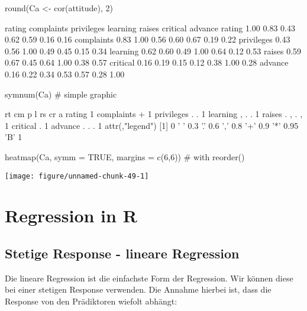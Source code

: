 \documentclass[a4paper,twoside]{tufte-book}\usepackage[]{graphicx}\usepackage[]{color}
\makeatletter
\def\maxwidth{ %
	\ifdim\Gin@nat@width>\linewidth
	\linewidth
	\else
	\Gin@nat@width
	\fi
}
\makeatother
\begin{document}
\begin{appendices}
\begin{Schunk}
\begin{Sinput}
round(Ca <- cor(attitude), 2)
\end{Sinput}
\begin{Soutput}
           rating complaints privileges learning raises critical advance
rating       1.00       0.83       0.43     0.62   0.59     0.16    0.16
complaints   0.83       1.00       0.56     0.60   0.67     0.19    0.22
privileges   0.43       0.56       1.00     0.49   0.45     0.15    0.34
learning     0.62       0.60       0.49     1.00   0.64     0.12    0.53
raises       0.59       0.67       0.45     0.64   1.00     0.38    0.57
critical     0.16       0.19       0.15     0.12   0.38     1.00    0.28
advance      0.16       0.22       0.34     0.53   0.57     0.28    1.00
\end{Soutput}
\begin{Sinput}
symnum(Ca) # simple graphic
\end{Sinput}
\begin{Soutput}
           rt cm p l rs cr a
rating     1                
complaints +  1             
privileges .  .  1          
learning   ,  .  . 1        
raises     .  ,  . , 1      
critical             .  1   
advance          . . .     1
attr(,"legend")
[1] 0 ' ' 0.3 '.' 0.6 ',' 0.8 '+' 0.9 '*' 0.95 'B' 1
\end{Soutput}
\begin{Sinput}
heatmap(Ca, symm = TRUE, margins = c(6,6)) # with reorder()
\end{Sinput}


{\centering \texttt{[image: figure/unnamed-chunk-49-1]} 

}

\end{Schunk}

\chapter{Regression in R}


\section{Stetige Response - lineare Regression}

Die lineare Regression ist die einfachste Form der Regression. Wir können diese bei einer stetigen Response verwenden. Die Annahme hierbei ist, dass die Response von den Prädiktoren wiefolt abhängt:


\end{appendices}
\end{document}
